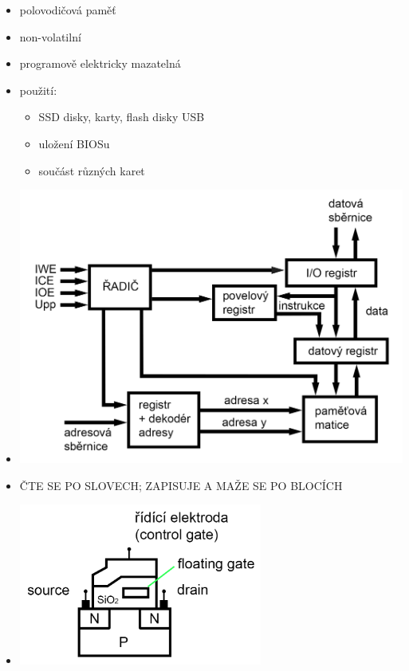 \documentclass[a4paper,12pt]{article}
\providecommand{\tightlist}{%
\setlength{\itemsep}{0pt}\setlength{\parskip}{0pt}}
\begin{document}
\begin{itemize}
  \tightlist
  \item polovodičová paměť
  \item non-volatilní
  \item programově elektricky mazatelná
  \item použití:
  \begin{itemize}
    \tightlist
    \item SSD disky, karty, flash disky USB
    \item uložení BIOSu
    \item součást různých karet
  \end{itemize}
  \item[] \includegraphics[width=15cm]{ref/blokove-schema-flash-pameti.png}
  \item {\large ČTE SE PO SLOVECH; ZAPISUJE A MAŽE SE PO BLOCÍCH}
  \item[]
  \begin{minipage}[b]{0.4\textwidth}
    \includegraphics[width=8cm]{ref/flash-tranzistor.png}
  \end{minipage}%
  \begin{minipage}[b]{0.5\textwidth}

\end{minipage}
\end{itemize}
\end{document}
